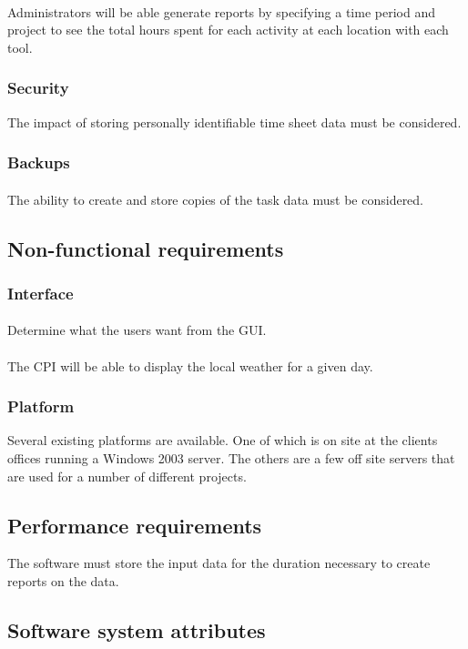 \documentclass[12pt]{article}
\begin{document}
\paragraph{} Administrators will be able generate reports by specifying a time period and project to see the total hours spent for each activity at each location with each tool.

\subsubsection{Security}\label{sec:Security}
The impact of storing personally identifiable time sheet data must be considered.

\subsubsection{Backups}\label{sec:Backups}
\paragraph{} The ability to create and store copies of the task data must be considered.

\subsection{Non-functional requirements}
\subsubsection{Interface}\label{sec:Interface}
\paragraph{} Determine what the users want from the GUI.
\paragraph{} The CPI will be able to display the local weather for a given day.

\subsubsection{Platform}\label{sec:Platform}
Several existing platforms are available. One of which is on site at the clients offices running a Windows 2003 server. The others are a few off site servers that are used for a number of different projects.

\subsection{Performance requirements}
The software must store the input data for the duration necessary to create reports on the data.

\subsection{Software system attributes}
\end{document}
